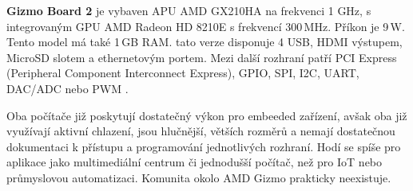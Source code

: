 \newpage
					
\textbf{ Gizmo Board 2} je vybaven APU AMD GX210HA na frekvenci 1 GHz, s integrovaným GPU AMD Radeon HD 8210E s frekvencí 300\,MHz. Příkon je 9\,W. Tento model má také 1\,GB RAM. tato verze disponuje 4 USB, HDMI výstupem, MicroSD slotem a ethernetovým portem. Mezi další rozhraní patří PCI Express (Peripheral Component Interconnect Express), GPIO, SPI, I2C, UART, DAC/ADC nebo PWM \cite{AmdGizmo2}.
	
Oba počítače již poskytují dostatečný výkon pro embeeded zařízení, avšak oba již využívají aktivní chlazení, jsou hlučnější, větších rozměrů a nemají dostatečnou dokumentaci k přístupu a programování jednotlivých rozhraní. Hodí se spíše pro aplikace jako multimediální centrum či jednodušší počítač, než pro IoT nebo průmyslovou automatizaci. Komunita okolo AMD Gizmo prakticky neexistuje.
	
	



